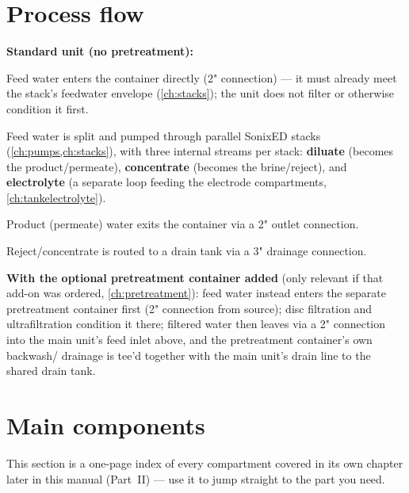 \documentclass[a4paper,11pt,twoside,openright,numbers=noenddot]{scrreprt}
\newcommand{\sonixed}{SonixED\texttrademark\xspace}
\begin{document}
\section{Process flow}
\textbf{Standard unit (no pretreatment):}
\begin{procedure}
\item Feed water enters the container directly (2" connection) --- it
  must already meet the stack's feedwater envelope (\cref{ch:stacks});
  the unit does not filter or otherwise condition it first.
\item Feed water is split and pumped through parallel \sonixed stacks
  (\cref{ch:pumps,ch:stacks}), with three internal streams per stack:
  \textbf{diluate} (becomes the product/permeate), \textbf{concentrate}
  (becomes the brine/reject), and \textbf{electrolyte} (a separate loop
  feeding the electrode compartments, \cref{ch:tankelectrolyte}).
\item Product (permeate) water exits the container via a 2" outlet
  connection.
\item Reject/concentrate is routed to a drain tank via a 3" drainage
  connection.
\end{procedure}
\textbf{With the optional pretreatment container added} (only relevant
if that add-on was ordered, \cref{ch:pretreatment}): feed water instead
enters the separate pretreatment container first (2\textonehalf"
connection from source); disc filtration and ultrafiltration condition
it there; filtered water then leaves via a 2" connection into the main
unit's feed inlet above, and the pretreatment container's own backwash/
drainage is tee'd together with the main unit's drain line to the shared
drain tank.

\section{Main components}
This section is a one-page index of every compartment covered in its own
chapter later in this manual (Part~II) --- use it to jump straight to the
part you need.
\end{document}
